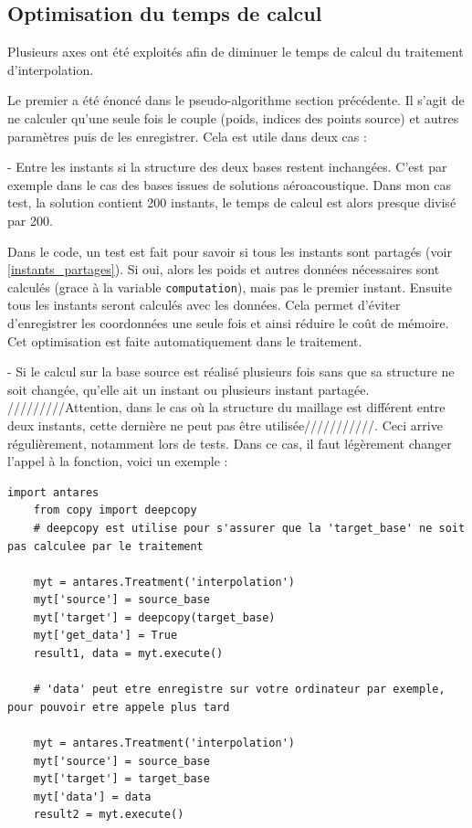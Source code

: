 

\subsection{Optimisation du temps de calcul}

Plusieurs axes ont été exploités afin de diminuer le temps de calcul du traitement d'interpolation.

Le premier a été énoncé dans le pseudo-algorithme section précédente. Il s'agit de ne calculer qu'une seule fois le couple (poids, indices des points source) et autres paramètres puis de les enregistrer. Cela est utile dans deux cas :

- Entre les instants si la structure des deux bases restent inchangées.
C'est par exemple dans le cas des bases issues de solutions aéroacoustique. Dans mon cas test, la solution contient 200 instants, le temps de calcul est alors presque divisé par 200.

Dans le code, un test est fait pour savoir si tous les instants sont partagés (voir \ref{instants_partages}). Si oui, alors les poids et autres données nécessaires sont calculés (grace à la variable \texttt{computation}), mais pas le premier instant. Ensuite tous les instants seront calculés avec les données. Cela permet d'éviter d'enregistrer les coordonnées une seule fois et ainsi réduire le coût de mémoire.
Cet optimisation est faite automatiquement dans le traitement.

- Si le calcul sur la base source est réalisé plusieurs fois sans que sa structure ne soit changée, qu'elle ait un instant ou plusieurs instant partagée. /////////Attention, dans le cas où la structure du maillage est différent entre deux instants, cette dernière ne peut pas être utilisée///////////. Ceci arrive régulièrement, notamment lors de tests. Dans ce cas, il faut légèrement changer l'appel à la fonction, voici un exemple :

\begin{lstlisting}[caption=Exemple de réutilisation des données, label={lst:antares}]
    import antares
    from copy import deepcopy
    # deepcopy est utilise pour s'assurer que la 'target_base' ne soit pas calculee par le traitement

    myt = antares.Treatment('interpolation')
    myt['source'] = source_base
    myt['target'] = deepcopy(target_base)
    myt['get_data'] = True
    result1, data = myt.execute()

    # 'data' peut etre enregistre sur votre ordinateur par exemple, pour pouvoir etre appele plus tard

    myt = antares.Treatment('interpolation')
    myt['source'] = source_base
    myt['target'] = target_base
    myt['data'] = data
    result2 = myt.execute()
\end{lstlisting}

